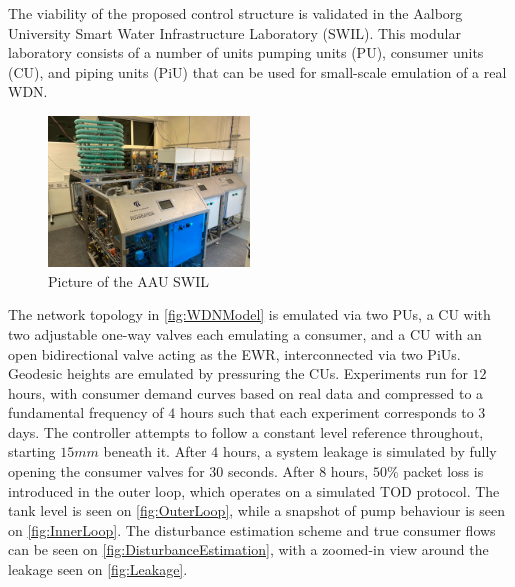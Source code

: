 The viability of the proposed control structure is validated in the Aalborg University Smart Water Infrastructure Laboratory (SWIL). This modular laboratory consists of a number of units pumping units (PU), consumer units (CU), and piping units (PiU) that can be used for small-scale emulation of a real WDN.

\begin{figure}[h!]
	\includegraphics[height=4cm, width=\linewidth]{Graphics/SWIL.pdf}
	\caption{Picture of the AAU SWIL}
	\label{fig:AAUSWIL}
\end{figure}

The network topology in \cref{fig:WDNModel} is emulated via two PUs, a CU with two adjustable one-way valves each emulating a consumer, and a CU with an open bidirectional valve acting as the EWR, interconnected via two PiUs. Geodesic heights are emulated by pressuring the CUs. Experiments run for $12$ hours, with consumer demand curves based on real data and compressed to a fundamental frequency of $4$ hours such that each experiment corresponds to $3$ days. The controller attempts to follow a constant level reference throughout, starting $15 \si{mm}$ beneath it. After $4$ hours, a system leakage is simulated by fully opening the consumer valves for $30$ seconds. After $8$ hours, $50\%$ packet loss is introduced in the outer loop, which operates on a simulated TOD protocol. The tank level is seen on \cref{fig:OuterLoop}, while a snapshot of pump behaviour is seen on \cref{fig:InnerLoop}. The disturbance estimation scheme and true consumer flows can be seen on \cref{fig:DisturbanceEstimation}, with a zoomed-in view around the leakage seen on \cref{fig:Leakage}.



